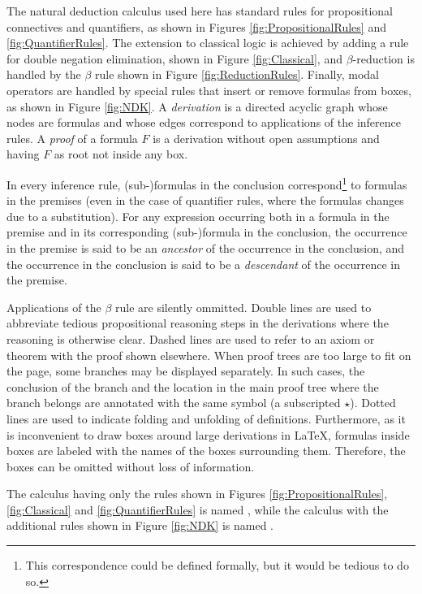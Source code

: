 \documentclass[smallextended]{svjour3}
\begin{document}
The natural deduction calculus used here has standard rules for propositional connectives and quantifiers, as shown in Figures \ref{fig:PropositionalRules} and \ref{fig:QuantifierRules}. The extension to classical logic is achieved by adding a rule for double negation elimination, shown in Figure \ref{fig:Classical}, and $\beta$-reduction is handled by the $\beta$ rule shown in Figure \ref{fig:ReductionRules}. Finally, modal operators are handled by special rules that insert or remove formulas from boxes, as shown in Figure \ref{fig:NDK}.
A \emph{derivation} is a directed acyclic graph whose nodes are formulas and whose edges correspond to applications of the inference rules. A \emph{proof} of a formula $F$ is a derivation without open assumptions and having $F$ as root not inside any box. 

In every inference rule, (sub-)formulas in the conclusion correspond\footnote{This correspondence could be defined formally, but it would be tedious to do so.} to formulas in the premises (even in the case of quantifier rules, where the formulas changes due to a substitution). For any expression occurring both in a formula in the premise and in its corresponding (sub-)formula in the conclusion, the occurrence in the premise is said to be an \emph{ancestor} of the occurrence in the conclusion, and the occurrence in the conclusion is said to be a \emph{descendant} of the occurrence in the premise.


\newcommand{\subproof}{\star}

Applications of the $\beta$ rule are silently ommitted. Double lines are used to abbreviate tedious propositional reasoning steps in the derivations where the reasoning is otherwise clear. Dashed lines are used to refer to an axiom or theorem with the proof shown elsewhere. When proof trees are too large to fit on the page, some branches may be displayed separately. In such cases, the conclusion of the branch and the location in the main proof tree where the branch belongs are annotated with the same symbol (a subscripted $\subproof$). Dotted lines are used to indicate folding and unfolding of definitions. Furthermore, as it is inconvenient to draw boxes around large derivations in \LaTeX, formulas inside boxes are labeled with the names of the boxes surrounding them. Therefore, the boxes can be omitted without loss of information. 

The calculus having only the rules shown in Figures \ref{fig:PropositionalRules}, \ref{fig:Classical} and \ref{fig:QuantifierRules} is named \ND, while the calculus with the additional rules shown in Figure \ref{fig:NDK} is named \NDK.
\end{document}
